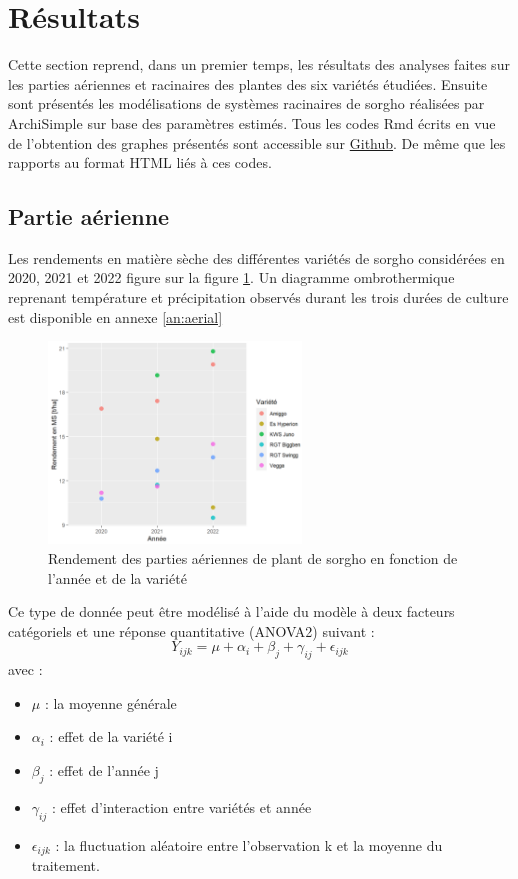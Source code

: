 \section{Résultats}

Cette section reprend, dans un premier temps, les résultats des analyses faites sur les parties aériennes et racinaires des plantes des six variétés étudiées.
Ensuite sont présentés les modélisations de systèmes racinaires de sorgho réalisées par ArchiSimple sur base des paramètres estimés.
Tous les codes Rmd écrits en vue de l'obtention des graphes présentés sont accessible sur \href{https://github.com/ndegives/Memoire}{Github}.
De même que les rapports au format HTML liés à ces codes.

\subsection{Partie aérienne}

Les rendements en matière sèche des différentes variétés de sorgho considérées en 2020, 2021 et 2022 figure sur la figure \ref{fig:rendement}.
Un diagramme ombrothermique reprenant température et précipitation observés durant les trois durées de culture est disponible en annexe \ref{an:aerial}


\begin{figure}[ht]
\centering
\includegraphics[width=0.6\textwidth]{Image/rendement.png}
\caption{Rendement des parties aériennes de plant de sorgho en fonction de l'année et de la variété}
\label{fig:rendement}
\end{figure}

Ce type de donnée peut être modélisé à l'aide du modèle à deux facteurs catégoriels et une réponse quantitative (ANOVA2) suivant :
\begin{equation}
    Y_{ijk} = \mu + \alpha_{i} + \beta_{j} + \gamma_{ij} + \epsilon_{ijk}
\end{equation}
avec :
\begin{itemize}
    \item $\mu$ : la moyenne générale
    \item $\alpha_i$ : effet de la variété i 
    \item $\beta_j$ : effet de l'année j
    \item $\gamma_{ij}$ : effet d'interaction entre variétés et année
    \item $\epsilon_{ijk}$ : la fluctuation aléatoire entre l'observation k et la moyenne du traitement. 
\end{itemize}

